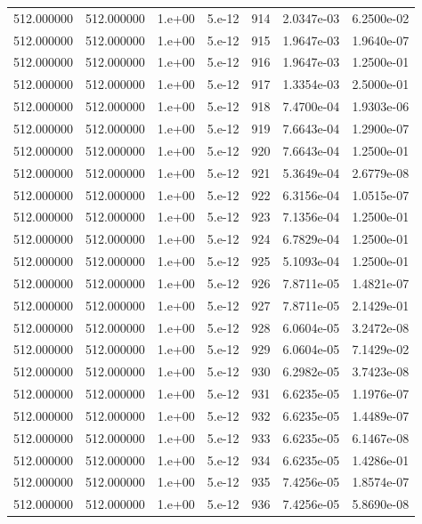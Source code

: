 \begin{table}[htbp]
\begin{tabular}{rrrrrrr}
512.000000 & 512.000000 & 1.e+00 & 5.e-12 & 914 & 2.0347e-03 & 6.2500e-02 \\
512.000000 & 512.000000 & 1.e+00 & 5.e-12 & 915 & 1.9647e-03 & 1.9640e-07 \\
512.000000 & 512.000000 & 1.e+00 & 5.e-12 & 916 & 1.9647e-03 & 1.2500e-01 \\
512.000000 & 512.000000 & 1.e+00 & 5.e-12 & 917 & 1.3354e-03 & 2.5000e-01 \\
512.000000 & 512.000000 & 1.e+00 & 5.e-12 & 918 & 7.4700e-04 & 1.9303e-06 \\
512.000000 & 512.000000 & 1.e+00 & 5.e-12 & 919 & 7.6643e-04 & 1.2900e-07 \\
512.000000 & 512.000000 & 1.e+00 & 5.e-12 & 920 & 7.6643e-04 & 1.2500e-01 \\
512.000000 & 512.000000 & 1.e+00 & 5.e-12 & 921 & 5.3649e-04 & 2.6779e-08 \\
512.000000 & 512.000000 & 1.e+00 & 5.e-12 & 922 & 6.3156e-04 & 1.0515e-07 \\
512.000000 & 512.000000 & 1.e+00 & 5.e-12 & 923 & 7.1356e-04 & 1.2500e-01 \\
512.000000 & 512.000000 & 1.e+00 & 5.e-12 & 924 & 6.7829e-04 & 1.2500e-01 \\
512.000000 & 512.000000 & 1.e+00 & 5.e-12 & 925 & 5.1093e-04 & 1.2500e-01 \\
512.000000 & 512.000000 & 1.e+00 & 5.e-12 & 926 & 7.8711e-05 & 1.4821e-07 \\
512.000000 & 512.000000 & 1.e+00 & 5.e-12 & 927 & 7.8711e-05 & 2.1429e-01 \\
512.000000 & 512.000000 & 1.e+00 & 5.e-12 & 928 & 6.0604e-05 & 3.2472e-08 \\
512.000000 & 512.000000 & 1.e+00 & 5.e-12 & 929 & 6.0604e-05 & 7.1429e-02 \\
512.000000 & 512.000000 & 1.e+00 & 5.e-12 & 930 & 6.2982e-05 & 3.7423e-08 \\
512.000000 & 512.000000 & 1.e+00 & 5.e-12 & 931 & 6.6235e-05 & 1.1976e-07 \\
512.000000 & 512.000000 & 1.e+00 & 5.e-12 & 932 & 6.6235e-05 & 1.4489e-07 \\
512.000000 & 512.000000 & 1.e+00 & 5.e-12 & 933 & 6.6235e-05 & 6.1467e-08 \\
512.000000 & 512.000000 & 1.e+00 & 5.e-12 & 934 & 6.6235e-05 & 1.4286e-01 \\
512.000000 & 512.000000 & 1.e+00 & 5.e-12 & 935 & 7.4256e-05 & 1.8574e-07 \\
512.000000 & 512.000000 & 1.e+00 & 5.e-12 & 936 & 7.4256e-05 & 5.8690e-08 \\

\end{tabular}
\end{table}
